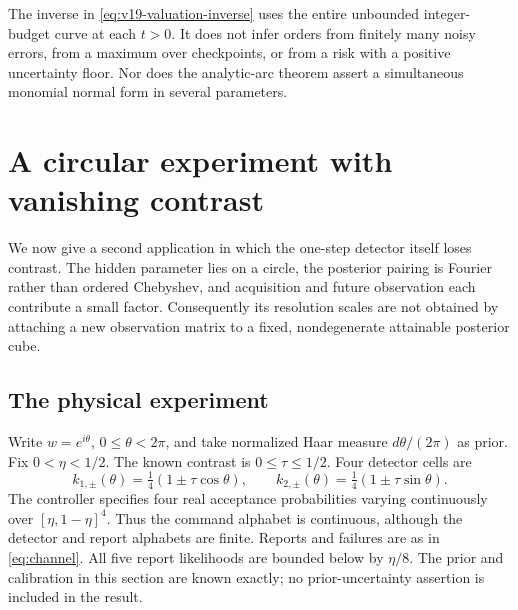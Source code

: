 \documentclass[11pt]{amsart}
\theoremstyle{definition}\newtheorem{definition}[theorem]{Definition}
\theoremstyle{remark}\newtheorem{remark}[theorem]{Remark}
\begin{document}
The inverse in \eqref{eq:v19-valuation-inverse} uses the entire
unbounded integer-budget curve at each $t>0$. It does not infer
orders from finitely many noisy errors, from a maximum over
checkpoints, or from a risk with a positive uncertainty floor.
Nor does the analytic-arc theorem assert a simultaneous monomial
normal form in several parameters.

\section{A circular experiment with vanishing contrast}
\label{sec:circular}
We now give a second application in which the one-step detector itself
loses contrast. The hidden parameter lies on a circle, the posterior
pairing is Fourier rather than ordered Chebyshev, and acquisition and
future observation each contribute a small factor. Consequently its
resolution scales are not obtained by attaching a new observation
matrix to a fixed, nondegenerate attainable posterior cube.

\subsection{The physical experiment}
Write $w=e^{i\theta}$, $0\le\theta<2\pi$, and take normalized Haar
measure $d\theta/(2\pi)$ as prior. Fix $0<\eta<1/2$. The known
contrast is $0\le\tau\le1/2$. Four detector cells are
\begin{equation}\label{eq:circle-cells}
 k_{1,\pm}(\theta)=\tfrac14(1\pm\tau\cos\theta),\qquad
 k_{2,\pm}(\theta)=\tfrac14(1\pm\tau\sin\theta).
\end{equation}
The controller specifies four real acceptance probabilities varying
continuously over $[\eta,1-\eta]^4$. Thus the command alphabet is
continuous, although the detector and report alphabets are finite. Reports and failures are as in
\eqref{eq:channel}. All five report likelihoods are bounded below by
$\eta/8$. The prior and calibration in this section are known exactly;
no prior-uncertainty assertion is included in the result.
\end{document}
